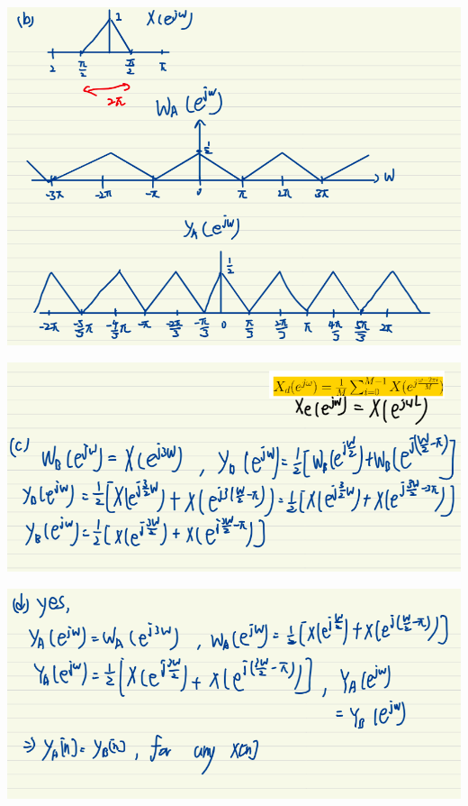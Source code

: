 \documentclass[a4paper]{article}
\begin{document}
	
	
	\begin{center}
		\includegraphics[width=1\linewidth]{screenshot080}
	\end{center}
	
	\begin{center}
		\includegraphics[width=1\linewidth]{screenshot081}
	\end{center}
	
	
	
	\begin{center}
		\includegraphics[width=1\linewidth]{screenshot082}
	\end{center}
	
\end{document}
